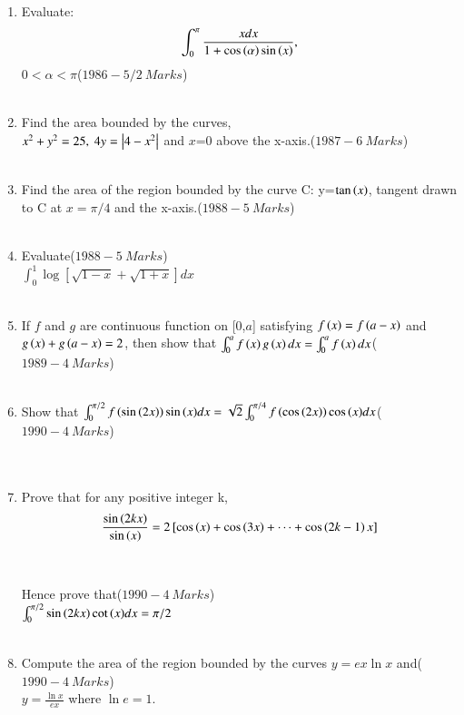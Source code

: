 \documentclass[journal,12pt,twocolumn]{IEEEtran}
\theoremstyle{remark}
\begin{document}
\begin{enumerate}
		     \item Evaluate:\begin{align*}
		         \int_{0}^{\pi}\frac{xdx}{1+\cos{\ensuremath{\left(\alpha\right)}}\sin{\ensuremath{\left(x\right)}}},
			 \end{align*}$0<\alpha<\pi$\hfill($1986-5/2\ Marks$)\\\\
			 \item Find the area bounded by the curves,\\ $x^2+y^2=25,\ 4y=\left\vert4-x^2\right\vert$ and $x$=0 above the x-axis.\hfill($1987-6\ Marks$)\\\\
			 \item Find the area of the region bounded by the curve C: y=$\tan{\ensuremath{\left(x\right)}}$, tangent drawn to C at $x=\pi/4$ and the x-axis.\hfill($1988-5\ Marks$)\\\\
			 \item Evaluate\hfill($1988-5\ Marks$)\\$\int_{0}^{1}\log[\sqrt{1-x}+\sqrt{1+x}]dx$\\\\
			 \item If $f$ and $g$ are continuous function on [0,$a$] satisfying $f\left(x\right)=f\left(a-x\right)$ and\\$g\left(x\right)+g\left(a-x\right)=2$, then show that $\int_{0}^{a}f\left(x\right)g\left(x\right)dx = \int_{0}^{a}f\left(x\right)dx$\hfill($1989-4\ Marks$)\\\\
			 \item Show that $\int_{0}^{\pi/2}f\left(\sin{\ensuremath{\left(2x\right)}}\right)\sin{\ensuremath{\left(x\right)}}dx=\sqrt{2}\int_{0}^{\pi/4}f\left(\cos{\ensuremath{\left(2x\right)}}\right)\cos{\ensuremath{\left(x\right)}}dx$\hfill($1990-4\ Marks$)\\\\\\
			 \item Prove that for any positive integer k,
				 \begin{align*} \frac{\sin{\ensuremath{\left(2kx\right)}}}{\sin{\ensuremath{\left(x\right)}}}=2{}\left[\cos{\ensuremath{\left(x\right)}}+\cos{\ensuremath{\left(3x\right)}}+\cdots+\cos{\ensuremath{\left(2k-1\right)}x}\right]
				 \end{align*}
					 \\\\Hence prove that\hfill($1990-4\ Marks$)\\ $\int_{0}^{\pi/2}\sin{\ensuremath{\left(2kx\right)}}\cot{\ensuremath{\left(x\right)}}dx=\pi/2$\\\\
			 \item Compute the area of the region bounded by the curves $y=ex\ln{x}$ and\hfill($1990-4\ Marks$)\\$y=\frac{\ln{x}}{ex}$ where $\ln{e}=1$.\\\\
			 \end{enumerate}
			 
\end{document}

